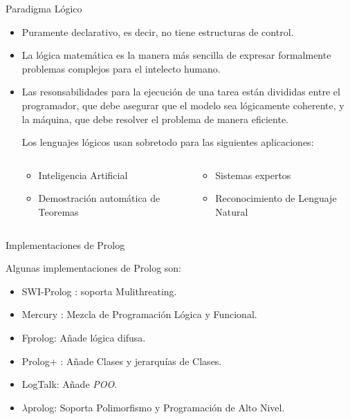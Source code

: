 \documentclass[xcolor=dvipsnames]{beamer}
\begin{document}
\begin{frame}{Paradigma Lógico}

\begin{itemize}
\item Puramente declarativo, es decir, no tiene estructuras de control.
\item La lógica matemática es la manera más sencilla de expresar formalmente problemas complejos para el intelecto humano.
\item Las resonsabilidades para la ejecución de una tarea están divididas entre el programador, que debe asegurar que el modelo sea lógicamente coherente, y la máquina, que debe resolver el problema de manera eficiente.


Los lenguajes lógicos usan sobretodo para las siguientes aplicaciones:

\begin{columns}
  \begin{column}{0.45\textwidth}
  \begin{itemize}
    \item Inteligencia Artificial
    \item Demostración automática de Teoremas
  \end{itemize}
  \end{column}

  \begin{column}{0.45\textwidth}
  \begin{itemize}
    \item Sistemas expertos
    \item Reconocimiento de Lenguaje Natural
  \end{itemize}
  \end{column}
\end{columns}

\end{itemize}

\end{frame}

\begin{frame}{Implementaciones de Prolog}

    Algunas implementaciones de Prolog son:

    \begin{itemize}
    \item SWI-Prolog : soporta Mulithreating.
    \item Mercury : Mezcla de Programación Lógica y Funcional.
    \item Fprolog: Añade lógica difusa.
    \item Prolog+ : Añade Clases y jerarquías de Clases.
    \item LogTalk: Añade \textit{POO}.
    \item $\lambda$prolog: Soporta Polimorfismo y Programación de Alto Nivel.
    \end{itemize}

\end{frame}
\end{document}
